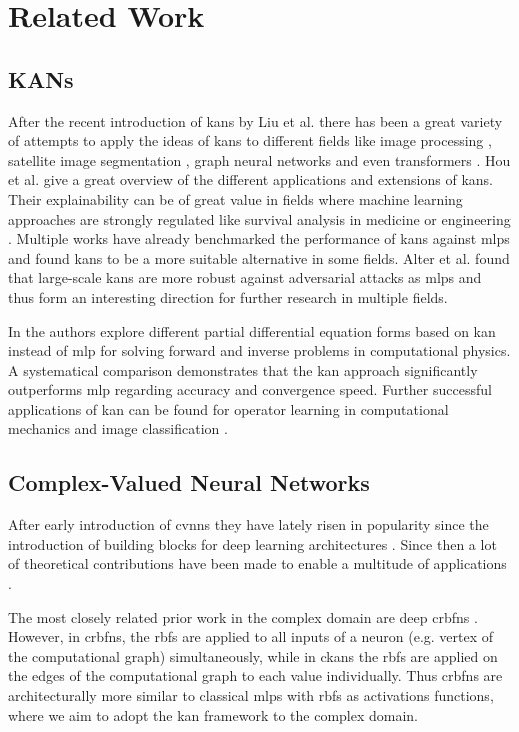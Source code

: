 \section{Related Work}
\subsection{KANs}
After the recent introduction of \acp{kan} by Liu et al. \cite{liu2024kan,liu2024kan20} there has been a great variety of attempts to apply the ideas of \acp{kan} to different fields like image processing \cite{bodner2024convolutional}, satellite image segmentation \cite{cambrin2024kan}, graph neural networks \cite{kiamari2024gkan,bresson2024kagnns} and even transformers \cite{yang2024kolmogorov}. Hou et al. \cite{hou2024comprehensive} give a great overview of the different applications and extensions of \acp{kan}. Their explainability can be of great value in fields where machine learning approaches are strongly regulated like survival analysis in medicine or engineering \cite{knottenbelt2024coxkan}. Multiple works have already benchmarked the performance of \acp{kan} against \acp{mlp} \cite{yu2024kan, poeta2024benchmarking} and found \acp{kan} to be a more suitable alternative in some fields. Alter et al. \cite{alter2024robustness} found that large-scale \acp{kan} are more robust against adversarial attacks as \acp{mlp} and thus form an interesting direction for further research in multiple fields.


In \cite{wang2025kolmogorov} the authors explore different partial differential equation forms based on \ac{kan} instead of \ac{mlp} for solving forward and inverse problems in computational physics. A systematical comparison demonstrates that the \ac{kan} approach significantly outperforms \ac{mlp} regarding accuracy and convergence 
speed. Further successful applications of \ac{kan} can be found for operator learning in computational mechanics \cite{Abueidda2025} and image classification \cite{Jamali2024}.


\subsection{Complex-Valued Neural Networks}
After early introduction of \acp{cvnn} \cite{hirose2003complex} they have lately risen in popularity since the introduction of building blocks for deep learning architectures \cite{trabelsi2018deep}. Since then a lot of theoretical contributions have been made \cite{tan2022real,eilers2023building,zhang2021optical} to enable a multitude of applications \cite{zhong2023real,chen2023spectral,liu2023pixelwise,xing2023phase,yakupouglu2024comparison}.

The most closely related prior work in the complex domain are deep \acp{crbfn} \cite{chen2008fully, soares2024deep}. However, in \acp{crbfn}, the \acp{rbf} are applied to all inputs of a neuron (e.g. vertex of the computational graph) simultaneously, while in \acp{ckan} the \acp{rbf} are applied on the edges of the computational graph to each value individually. Thus \acp{crbfn} are architecturally more similar to classical \acp{mlp} with \acp{rbf} as activations functions, where we aim to adopt the \ac{kan} framework to the complex domain.